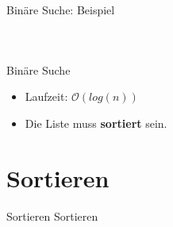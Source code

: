 \documentclass[18pt]{beamer}
\begin{document}
\begin{frame}{Binäre Suche: Beispiel}
\begin{center}
\begin{tabular}{|c|c|c|c|c|c|c|c|c|c|c|c|c|c|c|c|}
            \hline
        \end{tabular}
        \pause
        \begin{tabular}{|c|c|c|c|c|c|c|c|c|c|c|c|c|c|c|c|}
            \hline
            \cellcolor{darkgrey}{3} & \cellcolor{darkgrey}{4} & \cellcolor{darkgrey}{4} & \cellcolor{darkgrey}{5} & \cellcolor{darkgrey}{6} & \cellcolor{darkgrey}{7} & \cellcolor{lime}{9} & \cellcolor{lightgreen}{10} & \cellcolor{darkgrey}{11} & \cellcolor{darkgrey}{14} & \cellcolor{darkgrey}{17} & \cellcolor{darkgrey}{22} & \cellcolor{darkgrey}{24} & \cellcolor{darkgrey}{29} & \cellcolor{darkgrey}{32} & \cellcolor{darkgrey}{42} \\
            \hline
        \end{tabular}
        \pause
        \begin{tabular}{|c|c|c|c|c|c|c|c|c|c|c|c|c|c|c|c|}
            \hline
            \cellcolor{darkgrey}{3} & \cellcolor{darkgrey}{4} & \cellcolor{darkgrey}{4} & \cellcolor{darkgrey}{5} & \cellcolor{darkgrey}{6} & \cellcolor{darkgrey}{7} & \cellcolor{awesome}{9} & \cellcolor{darkgrey}{10} & \cellcolor{darkgrey}{11} & \cellcolor{darkgrey}{14} & \cellcolor{darkgrey}{17} & \cellcolor{darkgrey}{22} & \cellcolor{darkgrey}{24} & \cellcolor{darkgrey}{29} & \cellcolor{darkgrey}{32} & \cellcolor{darkgrey}{42} \\
            \hline
        \end{tabular}
    \end{center}
\end{frame}


\begin{frame}{Binäre Suche}
    \begin{itemize}
        \item Laufzeit: $\mathcal{O}(log(n))$
        \item Die Liste muss \textbf{sortiert} sein.
    \end{itemize}
\end{frame}

\section{Sortieren}

\begin{frame}{Sortieren}
    \center
    \Huge{Sortieren}
\end{frame}
\end{document}
